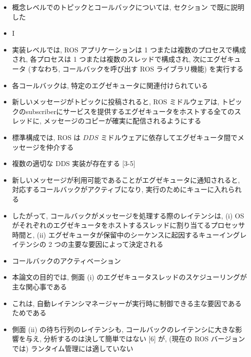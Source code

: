 \begin{frame}{}
    \begin{itemize}
        \item 概念レベルでのトピックとコールバックについては, セクション で既に説明した
\item I
\item 実装レベルでは, ROS アプリケーションは 1 つまたは複数のプロセスで構成され, 各プロセスは 1 つまたは複数のスレッドで構成され, 次にエグゼキュータ (すなわち, コールバックを呼び出す ROS ライブラリ機能) を実行する
\item 各コールバックは, 特定のエグゼキュータに関連付けられている
\item 新しいメッセージがトピックに投稿されると, ROS ミドルウェアは, トピックのsubscriberにサービスを提供するエグゼキュータをホストする全てのスレッドに, メッセージのコピーが確実に配信されるようにする
\item 標準構成では, ROS は $D D S$ ミドルウェアに依存してエグゼキュータ間でメッセージを仲介する
\item 複数の適切な DDS 実装が存在する [3-5]
    \end{itemize}
\end{frame}

\begin{frame}{}
    \begin{itemize}
        \item 新しいメッセージが利用可能であることがエグゼキュータに通知されると, 対応するコールバックがアクティブになり, 実行のためにキューに入れられる
\item したがって, コールバックがメッセージを処理する際のレイテンシは, (i) OS がそれぞれのエグゼキュータをホストするスレッドに割り当てるプロセッサ時間と, (ii) エグゼキュータが保留中のシーケンスに起因するキューイングレイテンシの 2 つの主要な要因によって決定される
\item コールバックのアクティベーション
    \end{itemize}
\end{frame}

\begin{frame}{}
    \begin{itemize}
        \item 本論文の目的では, 側面 (i) のエグゼキュータスレッドのスケジューリングが主な関心事である
\item これは, 自動レイテンシマネージャーが実行時に制御できる主な要因であるためである
\item 側面 (ii) の待ち行列のレイテンシも, コールバックのレイテンシに大きな影響を与え, 分析するのは決して簡単ではない [6] が, (現在の ROS バージョンでは) ランタイム管理には適していない
    \end{itemize}
\end{frame}

